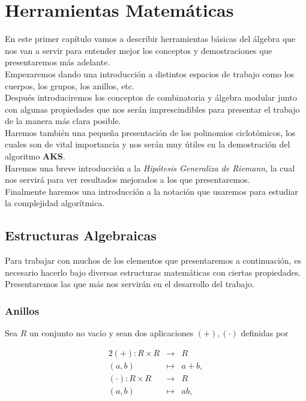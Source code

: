 \chapter{Herramientas Matemáticas}

En este primer capítulo vamos a describir herramientas básicas del álgebra que nos van a servir para entender mejor los conceptos y demostraciones que presentaremos más adelante.\\

Empezaremos dando una introducción a distintos espacios de trabajo como los cuerpos, los grupos, los anillos, etc.\\

Después introduciremos los conceptos de combinatoria y álgebra modular junto con algunas propiedades que nos serán imprescindibles para presentar el trabajo de la manera más clara posible.\\

Haremos también una pequeña presentación de los polinomios ciclotómicos, los cuales son de vital importancia y nos serán muy útiles en la demostración del algoritmo \textbf{AKS}.\\

Haremos una breve introducción a la \textit{Hipótesis Generaliza de Riemann}, la cual nos servirá para ver resultados mejorados a los que presentaremos.\\

Finalmente haremos una introducción a la notación que usaremos para estudiar la complejidad algorítmica.

\section{Estructuras Algebraicas}

Para trabajar con muchos de los elementos que presentaremos a continuación, es necesario hacerlo bajo diversas estructuras matemáticas con ciertas propiedades.\\

Presentaremos las que más nos servirán en el desarrollo del trabajo.

\subsection{Anillos}

Sea $R$ un conjunto no vacío y sean dos aplicaciones $(+), (\cdot)$ definidas por

\begin{alignat*}{2}
	(+): R \times R & \to & R \\
	(a, b) & \mapsto & a+b, \\
	(\cdot): R \times R & \to & R \\
	(a, b) & \mapsto & ab,
\end{alignat*}

